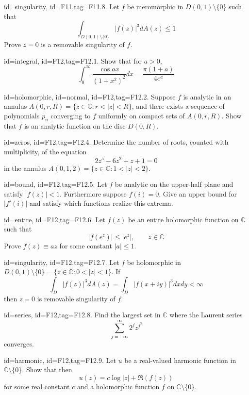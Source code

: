 \documentclass[12pt,letterpaper]{article}
\begin{document}
{\item[id=singularity, id=F11,tag=F11.8.]
Let $f$ be meromorphic in $D(0,1) \setminus \{0\}$ such that
\[
	\int_{D(0,1) \setminus \{0\}} | f(z) |^3 dA(z) \le 1
\]
Prove $z = 0$ is a removable singularity of $f$.


\item[id=integral, id=F12,tag=F12.1.]
Show that for $a > 0$,
\[
	\int_{0}^{\infty} \frac{\cos ax}{(1 + x^2)^2} dx = \frac{\pi(1+a)}{4 e^{a}}
\]

\item[id=holomorphic, id=normal, id=F12,tag=F12.2.]
Suppose $f$ is analytic in an annulus $A(0,r,R) = \{z \in \mathbb{C} \colon r < | z | < R\}$, and there exists a sequence of polynomials $p_n$ converging to $f$ uniformly on compact sets of $A(0,r,R)$. Show that $f$ is an analytic function on the disc $D(0,R)$. 

\item[id=zeros, id=F12,tag=F12.4.]
Determine the number of roots, counted with multiplicity, of the equation
\[
	2z^5 - 6z^2 + z + 1 = 0
\]
in the annulus $A(0,1,2) = \{z \in \mathbb{C} \colon 1 < | z | < 2\}$.
\item[id=bound, id=F12,tag=F12.5.]
Let $f$ be analytic on the upper-half plane and satisfy $| f(z) | < 1$. Furthermore suppose $f(i) = 0$. Give an upper bound for $| f'(i) |$ and satisfy which functions realize this extrema.

\item[id=entire, id=F12,tag=F12.6.]
Let $f(z)$ be an entire holomorphic function on $\mathbb{C}$ such that
\[
	| f(e^{z}) | \le | e^z |, \qquad z \in \mathbb{C}
\]
Prove $f(z) \equiv az$ for some constant $| a | \le 1$.
\item[id=singularity, id=F12,tag=F12.7.]
Let $f$ be holomorphic in $D(0,1) \setminus \{0\} = \{z \in \mathbb{C} \colon 0 < | z | < 1\}$. If
\[
	\int_{D} | f(z) |^3 dA(z) = \int_{D} | f(x+iy) |^3 dx dy < \infty
\]
then $z = 0$ is removable singularity of $f$.
\item[id=series, id=F12,tag=F12.8.]
Find the largest set in $\mathbb{C}$ where the Laurent series
\[
	\sum_{j=-\infty}^{\infty} 2^j z^{j^3}
\]
converges.
\item[id=harmonic, id=F12,tag=F12.9.]
Let $u$ be a real-valued harmonic function in $\mathbb{C} \setminus \{0\}$. Show that then
\[
	u(z) = c \log | z | + \Re (f(z))
\]
for some real constant $c$ and a holomorphic function $f$ on $\mathbb{C} \setminus \{0\}$.

}
\end{document}
